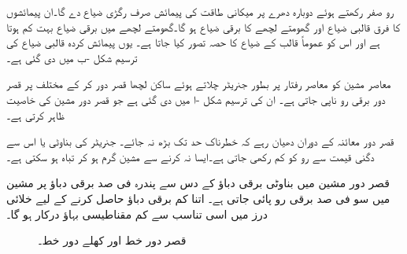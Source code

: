 رو   صفر رکھتے ہوئے دوبارہ دھرے پر میکانی طاقت  کی پیمائش صرف رگڑی ضیاع دے گا۔ان پیمائشوں کا فرق   قالبی ضیاع  اور گھومتے لچھے کا برقی ضیاع  ہو گا۔گھومتے لچھے میں برقی ضیاع بہت کم ہوتا ہے اور اس کو عموماً قالب کے ضیاع کا حصہ تصور کیا جاتا ہے۔ یوں  پیمائش کردہ قالبی ضیاع کی ترسیم شکل  -ب میں دی گئی ہے۔

معاصر مشین کو معاصر رفتار پر بطور جنریٹر  چلاتے ہوئے  ساکن لچھا قصر دور کر کے مختلف  پر قصر دور برقی رو  ناپی  جاتی  ہے۔ ان کی ترسیم شکل -ا میں دی گئی ہے جو قصر دور مشین کی خاصیت ظاہر کرتی ہے۔ 

 قصر دور معائنہ کے دوران  دھیان رہے  کہ   خطرناک حد تک  بڑھ نہ جائے۔  جنریٹر کی  بناوٹی   یا اس سے دگنی قیمت  سے رو کو  کم رکھی جاتی ہے۔ایسا نہ کرنے سے مشین گرم ہو کر تباہ ہو سکتی ہے۔

قصر دور مشین میں بناوٹی برقی دباؤ کے دس سے پندرہ فی صد برقی دباؤ پر مشین میں سو فی صد برقی رو پائی جاتی ہے۔ اتنا کم برقی دباؤ حاصل کرنے کے لیے خلائی درز میں اسی تناسب سے  کم مقناطیسی بہاؤ درکار ہو گا۔ 
\begin{figure}
\centering
\begin{subfigure}{0.45\textwidth}
\centering
{}%
\caption{}
\end{subfigure}\hfill
\begin{subfigure}{0.45\textwidth}
\centering
{}
\caption{}
\end{subfigure}%
\caption{قصر دور خط اور کھلے دور خط۔}
\label{شکل_معاصر_کسر_دور_اور_کھلے_دور_خط}
\end{figure}

